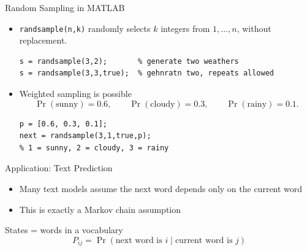 \documentclass[10pt]{beamer}
\begin{document}

\begin{frame}[fragile]{Random Sampling in MATLAB}

{
}

\begin{itemize}
    \item \texttt{randsample(n,k)} randomly selects $k$ integers
    from $1,\ldots,n$, without replacement.

\begin{lstlisting}
s = randsample(3,2);       % generate two weathers
s = randsample(3,3,true);  % gehnratn two, repeats allowed
\end{lstlisting}

    \item Weighted sampling is possible 
\[
    \Pr(\text{sunny})=0.6,\qquad
    \Pr(\text{cloudy})=0.3,\qquad
    \Pr(\text{rainy})=0.1.
\]
\begin{lstlisting}
p = [0.6, 0.3, 0.1];
next = randsample(3,1,true,p);
% 1 = sunny, 2 = cloudy, 3 = rainy
\end{lstlisting}

\end{itemize}
\end{frame}


\begin{frame}{Application: Text Prediction}

\begin{itemize}
    \item Many text models assume the next word depends only on the current word
    \item This is exactly a Markov chain assumption
\end{itemize}

\begin{example}
States = words in a vocabulary  
\[
P_{ij} = \Pr(\text{next word is } i \mid \text{current word is } j)
\]
\end{example}

\end{frame}
\end{document}
